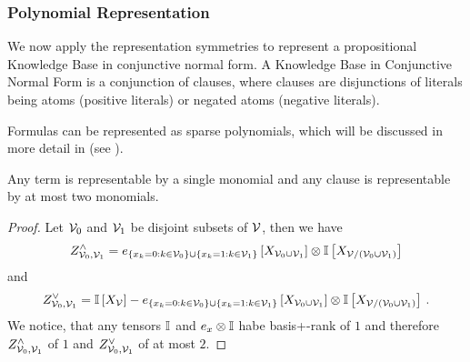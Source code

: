 


\subsubsection{Polynomial Representation}

We now apply the representation symmetries to represent a propositional Knowledge Base in conjunctive normal form.
A Knowledge Base in Conjunctive Normal Form is a conjunction of clauses, where clauses are disjunctions of literals being atoms (positive literals) or negated atoms (negative literals).

Formulas can be represented as sparse polynomials, which will be discussed in more detail in  (see ).

\begin{lemma}\label{lem:clauseTermBasisPlus}
	Any term is representable by a single monomial and any clause is representable by at most two monomials. %
\end{lemma}
\begin{proof}
	Let $\mathcal{V}_0$ and $\mathcal{V}_1$ be disjoint subsets of $\mathcal{V}$, then we have
	\begin{align*}
		Z^{\land}_{\mathcal{V}_0,\mathcal{V}_1} = e_{
			\{x_{k} = 0 : k\in\mathcal{V}_0\} \cup \{x_{k} = 1 : k\in\mathcal{V}_1\}
		}\left[X_{\mathcal{V}_0\cup\mathcal{V}_1}\right] \otimes \mathbb{I}\left[X_{\mathcal{V}/(\mathcal{V}_0\cup\mathcal{V}_1)}\right]
	\end{align*}
	and
	\begin{align*}
		Z^{\lor}_{\mathcal{V}_0,\mathcal{V}_1} = \mathbb{I}\left[X_{\mathcal{V}}\right] - e_{
			\{x_{k} = 0 : k\in\mathcal{V}_0\} \cup \{x_{k} = 1 : k\in\mathcal{V}_1\}
		}\left[X_{\mathcal{V}_0\cup\mathcal{V}_1}\right]
		\otimes \mathbb{I}\left[X_{\mathcal{V}/(\mathcal{V}_0\cup\mathcal{V}_1)}\right] \, . 
	\end{align*}
	We notice, that any tensors $\mathbb{I}$ and $e_{x}\otimes \mathbb{I}$ habe basis+-rank of $1$ and therefore $Z^{\land}_{\mathcal{V}_0,\mathcal{V}_1}$ of $1$ and $Z^{\lor}_{\mathcal{V}_0,\mathcal{V}_1}$ of at most $2$.
\end{proof}


